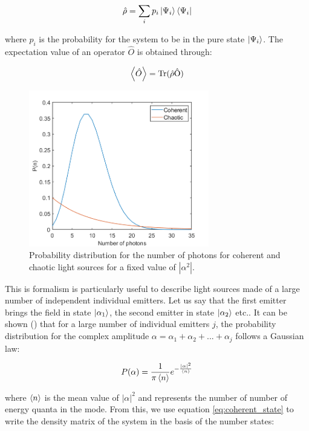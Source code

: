 \begin{equation}
    \hat{\rho} = \sum_{i} p_i \ket{\Psi_i} \bra{\Psi_i}
\end{equation}

\noindent where $p_i$ is the probability for the system to be in the pure state $\ket{\Psi_i}$. The expectation value of an operator $\hat{O}$ is obtained through:

\begin{equation}
    \left\langle\hat{O}\right\rangle = \rm{Tr}(\hat{\rho} \hat{O})
\end{equation}

\begin{figure}
    \centering
    \includegraphics[width=0.7\textwidth]{Fig/Chapter1/coherent_vs_chaotic.png}
    \caption{Probability distribution for the number of photons for coherent and chaotic light sources for a fixed value of $|\alpha^2|$.}
    \label{fig:light_statistics}
\end{figure}

This is formalism is particularly useful to describe light sources made of a large number of independent individual emitters. Let us say that the first emitter brings the field in state $\ket{\alpha_1}$, the second emitter in state $\ket{\alpha_2}$ etc.. It can be shown (\cite{glauber1963coherent}) that for a large number of individual emitters $j$, the probability distribution for the complex amplitude $\alpha=\alpha_1 + \alpha_2 + ... + \alpha_j$ follows a Gaussian law:

\begin{equation}
    P(\alpha)= \frac{1}{\pi \left\langle n\right\rangle} e^{-\frac{|\alpha|^2}{\left\langle n\right\rangle}}
    \label{eq:p_alpha}
\end{equation}

\noindent where $\left\langle n\right\rangle$ is the mean value of $|\alpha|^2$ and represents the number of number of energy quanta in the mode. From this, we use equation \ref{eq:coherent_state} to write the density matrix of the system in the basis of the number states:

